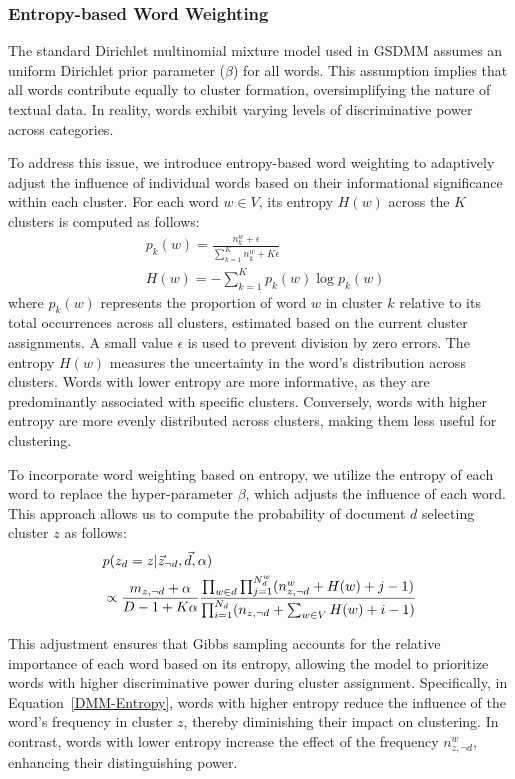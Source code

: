 \subsubsection{Entropy-based Word Weighting}
The standard Dirichlet multinomial mixture model used in GSDMM assumes an uniform Dirichlet prior parameter ($\beta$) for all words. This assumption implies that all words contribute equally to cluster formation, oversimplifying the nature of textual data. In reality, words exhibit varying levels of discriminative power across categories. 

To address this issue, we introduce entropy-based word weighting to adaptively adjust the influence of individual words based on their informational significance within each cluster.
For each word $w \in V$, its entropy $H(w)$ across the $K$ clusters is computed as follows:
\begin{align}
& \label{pk}
p_k(w) = \frac{n_k^w+\epsilon}{\sum_{k=1}^K n_k^w+K\epsilon} \\
& \label{hw}
H(w) = - \sum_{k=1}^K p_k(w) \log p_k(w)
\end{align}
where $p_k(w)$ represents the proportion of word $w$ in cluster $k$ relative to its total occurrences across all clusters, estimated based on the current cluster assignments. A small value $\epsilon$ is used to prevent division by zero errors. The entropy $H(w)$ measures the uncertainty in the word's distribution across clusters. Words with lower entropy are more informative, as they are predominantly associated with specific clusters. Conversely, words with higher entropy are more evenly distributed across clusters, making them less useful for clustering.

To incorporate word weighting based on entropy, we utilize the entropy of each word to replace the hyper-parameter $\beta$, which adjusts the influence of each word. This approach allows us to compute the probability of document $d$ selecting cluster $z$ as follows:
\begin{align}
& \notag
p(z_d=z | \vec{z}_{\neg{d}}, \vec{d}, \alpha)\\
&
\label{DMM-Entropy}
\propto \frac{m_{z,\neg{d}} + \alpha}{D-1 + K\alpha}
        \frac{\prod_{w \in d} \prod_{j=1}^{N_d^w} (n_{z,\neg{d}}^w + H(w) + j - 1)}
           {\prod_{i=1}^{N_d} (n_{z,\neg{d}} + \sum_{w \in V} H(w) + i - 1)}
\end{align}

This adjustment ensures that Gibbs sampling accounts for the relative importance of each word based on its entropy, allowing the model to prioritize words with higher discriminative power during cluster assignment. Specifically, in Equation~\eqref{DMM-Entropy}, words with higher entropy reduce the influence of the word's frequency in cluster $z$, thereby diminishing their impact on clustering. In contrast, words with lower entropy increase the effect of the frequency $n_{z,\neg{d}}^w$, enhancing their distinguishing power.

